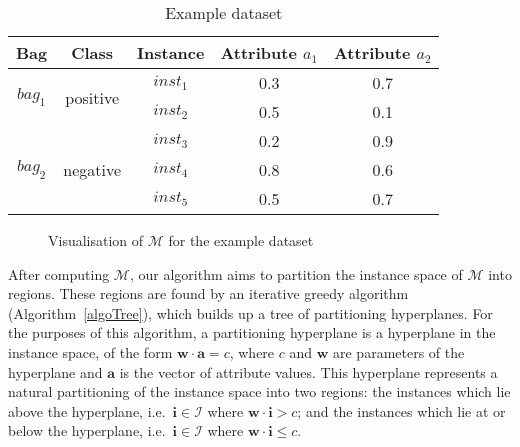 \documentclass[a4paper,12pt]{article} %
\newcommand{\mcl}[1]{\mathcal{#1}}
\newcommand{\vect}[1]{\boldsymbol{#1}}
\begin{document}
\begin{table}
\begin{center}
\begin{tabular}{ccccc}
    \toprule
    Bag & Class & Instance & Attribute $a_1$ & Attribute $a_2$ \\
    \midrule
    \multirow{2}{*}{$bag_1$} & \multirow{2}{*}{positive} & $inst_1$ & 0.3 & 0.7 \\
    &  & $inst_2$ & 0.5 & 0.1 \\
    \cmidrule(r){1-5}
    \multirow{3}{*}{$bag_2$} & \multirow{3}{*}{negative} & $inst_3$ & 0.2 & 0.9 \\
    & & $inst_4$ & 0.8 & 0.6 \\
    & & $inst_5$ & 0.5 & 0.7 \\
    \bottomrule
    
\end{tabular}
\end{center}
\caption{Example dataset}
\label{tEgData}
\end{table}

\begin{figure}
\begin{center}
\end{center}
\caption{Visualisation of $\mcl{M}$ for the example dataset}
\label{visM}
\end{figure}

After computing $\mcl{M}$, 
    our algorithm
    aims to partition the instance space of $\mcl{M}$ into regions.
These regions are found by an iterative greedy algorithm (Algorithm~\ref{algoTree}), 
    which builds up a tree of partitioning hyperplanes.
For the purposes of this algorithm, 
    a partitioning hyperplane is a hyperplane in the instance space, 
    of the form $\vect{w} \cdot \vect{a} = c$,
    where $c$ and $\vect{w}$ are parameters of the hyperplane and 
    $\vect{a}$ is the vector of attribute values.
This hyperplane represents a natural partitioning of the instance space
    into two regions:
        the instances which lie above the hyperplane, 
            i.e.\ $\vect{i} \in \mcl{I}$ where $\vect{w} \cdot \vect{i} > c$; and
        the instances which lie at or below the hyperplane,
            i.e.\ $\vect{i} \in \mcl{I}$ where $\vect{w} \cdot \vect{i} \leq c$.
    
\end{document}
